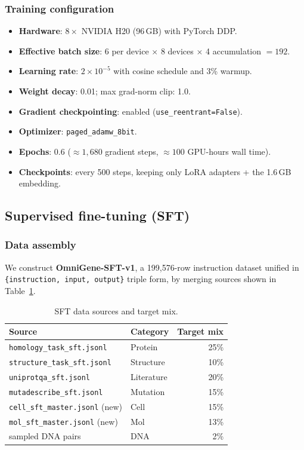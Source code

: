 \documentclass[11pt]{article}
\begin{document}
\subsubsection{Training configuration}

\begin{itemize}\setlength\itemsep{0pt}
\item \textbf{Hardware}: $8 \times$ NVIDIA H20 (96\,GB) with PyTorch DDP.
\item \textbf{Effective batch size}: 6 per device $\times$ 8 devices $\times$ 4 accumulation $= 192$.
\item \textbf{Learning rate}: $2 \times 10^{-5}$ with cosine schedule and 3\% warmup.
\item \textbf{Weight decay}: 0.01; max grad-norm clip: 1.0.
\item \textbf{Gradient checkpointing}: enabled (\texttt{use\_reentrant=False}).
\item \textbf{Optimizer}: \texttt{paged\_adamw\_8bit}.
\item \textbf{Epochs}: 0.6 ($\approx 1{,}680$ gradient steps, $\approx 100$ GPU-hours wall time).
\item \textbf{Checkpoints}: every 500 steps, keeping only LoRA adapters + the 1.6\,GB embedding.
\end{itemize}

\subsection{Supervised fine-tuning (SFT)}

\subsubsection{Data assembly}

We construct \textbf{OmniGene-SFT-v1}, a 199{,}576-row instruction dataset unified in \texttt{\{instruction, input, output\}} triple form, by merging sources shown in Table~\ref{tab:sft-data}.

\begin{table}[H]
\centering
\small
\caption{SFT data sources and target mix.}
\label{tab:sft-data}
\begin{tabular}{llr}
\toprule
\textbf{Source} & \textbf{Category} & \textbf{Target mix} \\
\midrule
\texttt{homology\_task\_sft.jsonl}    & Protein     & 25\% \\
\texttt{structure\_task\_sft.jsonl}   & Structure   & 10\% \\
\texttt{uniprotqa\_sft.jsonl}         & Literature  & 20\% \\
\texttt{mutadescribe\_sft.jsonl}      & Mutation    & 15\% \\
\texttt{cell\_sft\_master.jsonl} (new) \citep{franzen2019panglaodb} & Cell  & 15\% \\
\texttt{mol\_sft\_master.jsonl} (new) \citep{wu2018moleculenet}  & Mol   & 13\% \\
sampled DNA pairs                     & DNA         & 2\%  \\
\bottomrule
\end{tabular}
\end{table}
\end{document}
